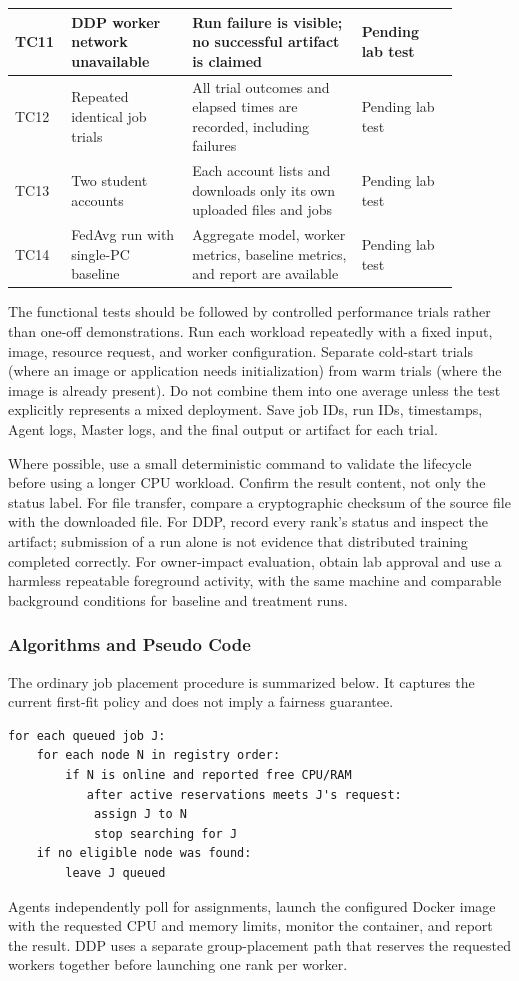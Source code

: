 \documentclass{article}
\begin{document}
\begin{table}[h!]
\begin{tabular}{|p{0.08\linewidth}|p{0.25\linewidth}|p{0.35\linewidth}|p{0.2\linewidth}|}
\hline
TC11 & DDP worker network unavailable & Run failure is visible; no successful artifact is claimed & Pending lab test \\
\hline
TC12 & Repeated identical job trials & All trial outcomes and elapsed times are recorded, including failures & Pending lab test \\
\hline
TC13 & Two student accounts & Each account lists and downloads only its own uploaded files and jobs & Pending lab test \\
\hline
TC14 & FedAvg run with single-PC baseline & Aggregate model, worker metrics, baseline metrics, and report are available & Pending lab test \\
\hline
\end{tabular}
\end{table}

The functional tests should be followed by controlled performance trials rather than one-off demonstrations. Run each workload repeatedly with a fixed input, image, resource request, and worker configuration. Separate cold-start trials (where an image or application needs initialization) from warm trials (where the image is already present). Do not combine them into one average unless the test explicitly represents a mixed deployment. Save job IDs, run IDs, timestamps, Agent logs, Master logs, and the final output or artifact for each trial.

Where possible, use a small deterministic command to validate the lifecycle before using a longer CPU workload. Confirm the result content, not only the status label. For file transfer, compare a cryptographic checksum of the source file with the downloaded file. For DDP, record every rank's status and inspect the artifact; submission of a run alone is not evidence that distributed training completed correctly. For owner-impact evaluation, obtain lab approval and use a harmless repeatable foreground activity, with the same machine and comparable background conditions for baseline and treatment runs.

	\subsubsection{Algorithms and Pseudo Code}
The ordinary job placement procedure is summarized below. It captures the current first-fit policy and does not imply a fairness guarantee.
\begin{verbatim}
for each queued job J:
    for each node N in registry order:
        if N is online and reported free CPU/RAM
           after active reservations meets J's request:
            assign J to N
            stop searching for J
    if no eligible node was found:
        leave J queued
\end{verbatim}
Agents independently poll for assignments, launch the configured Docker image with the requested CPU and memory limits, monitor the container, and report the result. DDP uses a separate group-placement path that reserves the requested workers together before launching one rank per worker.
\end{document}
